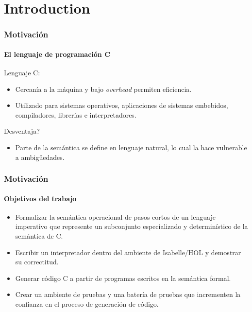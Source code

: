 \section{Introduction}

\begin{frame}
\frametitle{Motivación}
\framesubtitle{El lenguaje de programación C}

\pause

Lenguaje C:

\pause

\begin{itemize}
\item{Cercanía  a la máquina y bajo \textit{overhead} permiten eficiencia.}
\pause
\item{Utilizado para sistemas operativos, aplicaciones de sistemas embebidos, compiladores, librerías e interpretadores.}
\pause
\end{itemize}

Desventaja?
\pause
\begin{itemize}
\item{Parte de la semántica se define en lenguaje natural, lo cual la hace vulnerable a ambigüedades.}
\end{itemize}

\end{frame}


\begin{frame}
\frametitle{Motivación}
\framesubtitle{Objetivos del trabajo}

\pause
\begin{itemize}
\item{Formalizar la semántica operacional de pasos cortos de un lenguaje imperativo que represente un subconjunto especializado y determinístico de la semántica de C.}
\pause
\item{Escribir un interpretador dentro del ambiente de Isabelle/HOL y demostrar su correctitud.}
\pause
\item{Generar código C a partir de programas escritos en la semántica formal.}
\pause
\item{Crear un ambiente de pruebas y una batería de pruebas que incrementen la confianza en el proceso de generación de código.}
\end{itemize}

\end{frame}


